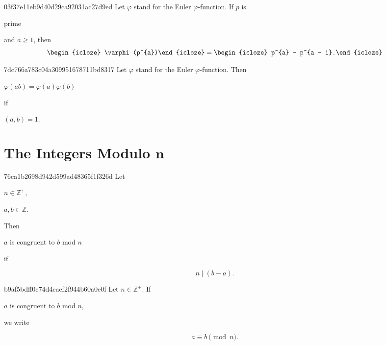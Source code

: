 \begin{note}{03f37e11eb9d40d29ca92031ac27d9ed}
    Let \({ \varphi }\) stand for the Euler \({ \varphi }\)-function.
    If \({ p }\) is \begin{icloze}{3}prime\end{icloze} and \({ a \geq 1 }\), then
    \[
        \begin{icloze}{2}\varphi(p^{a})\end{icloze} = \begin{icloze}{1}p^{a} - p^{a - 1}.\end{icloze}
    \]
\end{note}

\begin{note}{7dc766a783c04a309951678711bd8317}
    Let \({ \varphi }\) stand for the Euler \({ \varphi }\)-function.
    Then
    \begin{center}
        \begin{icloze}{1}\({ \varphi(ab) = \varphi(a) \varphi(b) }\)\end{icloze} \quad if \begin{icloze}{2}\({ (a, b) = 1 }\).\end{icloze}
    \end{center}
\end{note}

\section{The Integers Modulo \({ \mathbf{n} }\)}
\begin{note}{76ca1b2698d942d599ad48365f1f326d}
    Let \begin{icloze}{3}\({ n \in \mathbb Z^{+} }\),\end{icloze} \begin{icloze}{4}\({ a, b \in \mathbb Z }\).\end{icloze}
    Then \begin{icloze}{2}\({ a }\) is congruent to \({ b }\) mod \({ n }\)\end{icloze} if
    \begin{icloze}{1}
        \[
            n \mid (b - a).
        \]
    \end{icloze}
\end{note}

\begin{note}{b9af5bdff0c74d4caef2f944b60a0e0f}
    Let \({ n \in \mathbb Z^{+} }\).
    If \begin{icloze}{2}\({ a }\) is congruent to \({ b }\) mod \({ n }\),\end{icloze} we write
    \begin{icloze}{1}
        \[
            a \equiv b \pmod n.
        \]
    \end{icloze}
\end{note}

